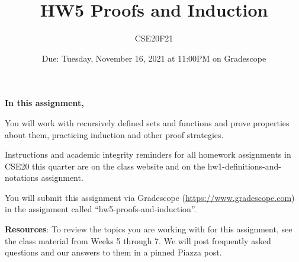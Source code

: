 \documentclass[12pt, oneside]{article}
\author{CSE20F21}
\title{HW5 Proofs and Induction}
\date{Due: Tuesday, November 16, 2021 at 11:00PM on Gradescope}
\begin{document}
\maketitle
\thispagestyle{fancy}

{\bf In this assignment,}

You will work with recursively defined sets and functions and prove 
properties about them, practicing induction and other proof strategies.

Instructions and academic integrity reminders for all homework assignments in 
CSE20 this quarter are on the class website and on the hw1-definitions-and-notations
assignment.

You will submit this assignment via Gradescope
(\href{https://www.gradescope.com}{https://www.gradescope.com}) 
in the assignment called ``hw5-proofs-and-induction''.

{\bf Resources}: To review the topics you are working with 
for this assignment, see the class material from Weeks 5 through 7.
We will post frequently asked questions and our answers to them in a 
pinned Piazza post.
\end{document}
